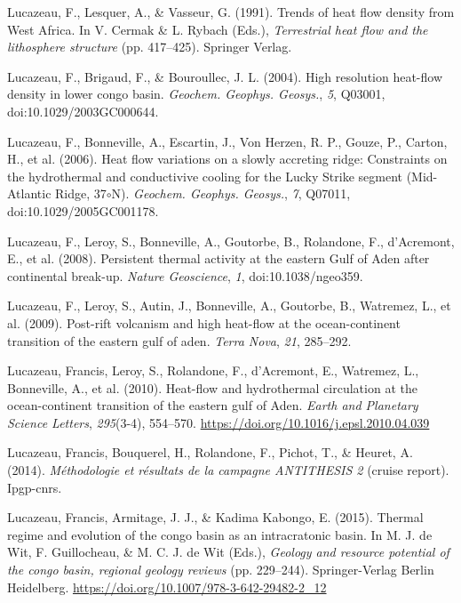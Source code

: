 \documentclass[draft,linenumbers]{agujournal2018}
\begin{document}
\leavevmode{}%
Lucazeau, F., Lesquer, A., \& Vasseur, G. (1991). Trends of heat flow
density from {West Africa}. In V. Cermak \& L. Rybach (Eds.),
\emph{Terrestrial heat flow and the lithosphere structure} (pp.
417--425). Springer Verlag.

\leavevmode{}%
Lucazeau, F., Brigaud, F., \& Bouroullec, J. L. (2004). High resolution
heat-flow density in lower congo basin. \emph{Geochem. Geophys.
Geosys.}, \emph{5}, Q03001, doi:10.1029/2003GC000644.

\leavevmode{}%
Lucazeau, F., Bonneville, A., Escartin, J., Von Herzen, R. P., Gouze,
P., Carton, H., et al. (2006). Heat flow variations on a slowly
accreting ridge: Constraints on the hydrothermal and conductivive
cooling for the {Lucky Strike} segment {(Mid-Atlantic Ridge,
37\(\circ\)N)}. \emph{Geochem. Geophys. Geosys.}, \emph{7}, Q07011,
doi:10.1029/2005GC001178.

\leavevmode{}%
Lucazeau, F., Leroy, S., Bonneville, A., Goutorbe, B., Rolandone, F.,
d'Acremont, E., et al. (2008). Persistent thermal activity at the
eastern {Gulf of Aden} after continental break-up. \emph{Nature
Geoscience}, \emph{1}, doi:10.1038/ngeo359.

\leavevmode{}%
Lucazeau, F., Leroy, S., Autin, J., Bonneville, A., Goutorbe, B.,
Watremez, L., et al. (2009). Post-rift volcanism and high heat-flow at
the ocean-continent transition of the eastern gulf of aden. \emph{Terra
Nova}, \emph{21}, 285--292.

\leavevmode{}%
Lucazeau, Francis, Leroy, S., Rolandone, F., d'Acremont, E., Watremez,
L., Bonneville, A., et al. (2010). Heat-flow and hydrothermal
circulation at the ocean-continent transition of the eastern {gulf of
Aden}. \emph{Earth and Planetary Science Letters}, \emph{295}(3-4),
554--570. \url{https://doi.org/10.1016/j.epsl.2010.04.039}

\leavevmode{}%
Lucazeau, Francis, Bouquerel, H., Rolandone, F., Pichot, T., \& Heuret,
A. (2014). \emph{Méthodologie et résultats de la campagne ANTITHESIS 2}
(cruise report). Ipgp-cnrs.

\leavevmode{}%
Lucazeau, Francis, Armitage, J. J., \& Kadima Kabongo, E. (2015).
Thermal regime and evolution of the congo basin as an intracratonic
basin. In M. J. de Wit, F. Guillocheau, \& M. C. J. de Wit (Eds.),
\emph{Geology and resource potential of the congo basin, regional
geology reviews} (pp. 229--244). Springer-Verlag Berlin Heidelberg.
\url{https://doi.org/10.1007/978-3-642-29482-2_12}
\end{document}
